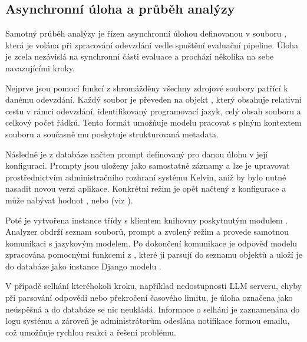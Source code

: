 \subsection{Asynchronní úloha a průběh analýzy}
\label{subsec:implementation-job}

Samotný průběh analýzy je řízen asynchronní úlohou definovanou v souboru , která je volána při zpracování odevzdání vedle spuštění evaluační pipeline.
Úloha je zcela nezávislá na synchronní části evaluace a prochází několika na sebe navazujícími kroky.

Nejprve jsou pomocí funkcí z  shromážděny všechny zdrojové soubory patřící k danému odevzdání.
Každý soubor je převeden na objekt , který obsahuje relativní cestu v rámci odevzdání, identifikovaný programovací jazyk, celý obsah souboru a celkový počet řádků.
Tento formát umožňuje modelu pracovat s plným kontextem souboru a současně mu poskytuje strukturovaná metadata.

Následně je z databáze načten prompt definovaný pro danou úlohu v její konfiguraci.
Prompty jsou uloženy jako samostatné záznamy a lze je upravovat prostřednictvím administračního rozhraní systému Kelvin, aniž by bylo nutné nasadit novou verzi aplikace.
Konkrétní režim je opět načtený z konfigurace a může nabývat hodnot ,  nebo  (viz ).

Poté je vytvořena instance třídy  s klientem knihovny  poskytnutým modulem .
Analyzer obdrží seznam souborů, prompt a zvolený režim a provede samotnou komunikaci s jazykovým modelem.
Po dokončení komunikace je odpověď modelu zpracována pomocnými funkcemi z , které ji parsují do seznamu objektů  a uloží je do databáze jako instance Django modelu .

V případě selhání kteréhokoli kroku, například nedostupnosti LLM serveru, chyby při parsování odpovědi nebo překročení časového limitu, je úloha označena jako neúspěšná a do databáze se nic neukládá.
Informace o selhání je zaznamenána do logu systému a zároveň je administrátorům odeslána notifikace formou emailu, což umožňuje rychlou reakci a řešení problému.


\endinput